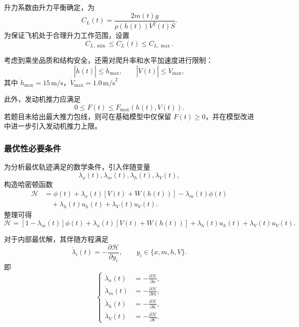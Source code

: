 \documentclass[withoutpreface,bwprint]{cumcmthesis} %
\begin{document}
升力系数由升力平衡确定，为
\begin{equation}
    C_L(t)=\frac{2m(t)g}{\rho(h(t))V^2(t)S}.
    \label{eq:q3_CL}
\end{equation}
为保证飞机处于合理升力工作范围，设置
\begin{equation}
    C_{L,\min}\leq C_L(t)\leq C_{L,\max}.
    \label{eq:q3_CL_bounds}
\end{equation}

考虑到乘坐品质和结构安全，还需对爬升率和水平加速度进行限制：
\begin{equation}
    |\dot h(t)| \leq \dot h_{\max}, \qquad |\dot V(t)| \leq \dot V_{\max},
\end{equation}
其中 $\dot h_{\max}=15\,\text{m/s}$，$\dot V_{\max}=1.0\,\text{m/s}^2$

此外，发动机推力应满足
\begin{equation}
    0\leq F(t)\leq F_{\max}(h(t),V(t)).
    \label{eq:q3_thrust_constraint}
\end{equation}
若题目未给出最大推力包线，则可在基础模型中仅保留 $F(t)\geq0$，并在模型改进中进一步引入发动机推力上限。

\subsubsection{最优性必要条件}

为分析最优轨迹满足的数学条件，引入伴随变量
\[
\lambda_x(t),\lambda_m(t),\lambda_h(t),\lambda_V(t),
\]
构造哈密顿函数
\begin{equation}
\begin{aligned}
    \mathcal H
    &=
    \phi(t)
    +\lambda_x(t)\left[V(t)+W(h(t))\right]
    -\lambda_m(t)\phi(t) \\
    &\quad
    +\lambda_h(t)u_h(t)
    +\lambda_V(t)u_V(t).
\end{aligned}
\label{eq:q3_Hamiltonian}
\end{equation}
整理可得
\begin{equation}
    \mathcal H
    =
    \left[1-\lambda_m(t)\right]\phi(t)
    +\lambda_x(t)\left[V(t)+W(h(t))\right]
    +\lambda_h(t)u_h(t)
    +\lambda_V(t)u_V(t).
    \label{eq:q3_Hamiltonian_simple}
\end{equation}

对于内部最优解，其伴随方程满足
\begin{equation}
    \dot{\lambda}_i(t)
    =
    -\frac{\partial \mathcal H}{\partial y_i},
    \qquad
    y_i\in\{x,m,h,V\}.
    \label{eq:q3_adjoint}
\end{equation}
即
\begin{equation}
\left\{
\begin{aligned}
    \dot\lambda_x(t)&=-\frac{\partial \mathcal H}{\partial x},\\
    \dot\lambda_m(t)&=-\frac{\partial \mathcal H}{\partial m},\\
    \dot\lambda_h(t)&=-\frac{\partial \mathcal H}{\partial h},\\
    \dot\lambda_V(t)&=-\frac{\partial \mathcal H}{\partial V}.
\end{aligned}
\right.
\label{eq:q3_adjoint_system}
\end{equation}
\end{document}
